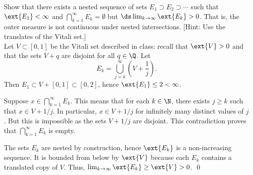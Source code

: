 \begin{hwsol}
Show that there exists a nested sequence of sets $E_1 \supset E_2 \supset \cdots$ such that $\ext{E_1} < \infty$ and $\bigcap_{k=1}^\infty E_k= \emptyset$ but $\ds\lim_{k \to \infty} \ext{E_k} > 0$. That is, the outer measure is not continuous under nested intersections. [Hint: Use the translates of the Vitali set.] \\

\pf Let $V \subset [0, 1]$ be the Vitali set described in class: recall that  $\ext{V} > 0$ and that the sets $V+q$ are disjoint for all $q \in \Q$. Let 
        \[
        E_k= \bigcup_{j=k}^\infty \left( V + \frac{1}{j} \right).
        \]
Then $E_1 \subset V + [0, 1] \subset [0, 2]$, hence $\ext{E_1} \leq 2 < \infty$. 

Suppose $x \in \bigcap_{k=1}^\infty E_k$. This means that for each $k \in \N$, there exists $j \geq k$ such that $x \in V+1/j$. In particular, $x \in V+1/j$ for infinitely many distinct values of $j$. But this is impossible as the sets $V+1/j$ are disjoint. This contradiction proves that $\bigcap_{k=1}^\infty E_k$ is empty.

The sets $E_k$ are nested by construction, hence $\ext{E_k}$ is a non-increasing sequence. It is bounded from below by $\ext{V}$ because each $E_k$ contains a translated copy of $V$. Thus, $\lim_{k \to \infty} \ext{E_k} \geq \ext{V} > 0$. \qed \\
\end{hwsol}


